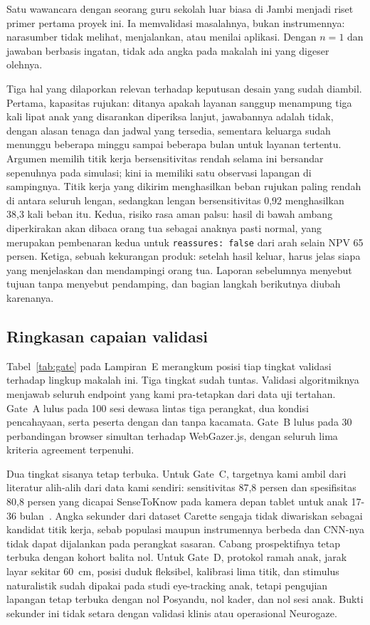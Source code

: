 \documentclass{article}
\begin{document}
Satu wawancara dengan seorang guru sekolah luar biasa di Jambi menjadi riset primer pertama
proyek ini. Ia memvalidasi masalahnya, bukan instrumennya: narasumber tidak melihat,
menjalankan, atau menilai aplikasi. Dengan $n = 1$ dan jawaban berbasis ingatan, tidak ada
angka pada makalah ini yang digeser olehnya.

Tiga hal yang dilaporkan relevan terhadap keputusan desain yang sudah diambil. Pertama,
kapasitas rujukan: ditanya apakah layanan sanggup menampung tiga kali lipat anak yang
disarankan diperiksa lanjut, jawabannya adalah tidak, dengan alasan tenaga dan jadwal yang
tersedia, sementara keluarga sudah menunggu beberapa minggu sampai beberapa bulan untuk
layanan tertentu. Argumen memilih titik kerja bersensitivitas rendah selama ini bersandar
sepenuhnya pada simulasi; kini ia memiliki satu observasi lapangan di sampingnya. Titik kerja
yang dikirim menghasilkan beban rujukan paling rendah di antara seluruh lengan, sedangkan
lengan bersensitivitas 0,92 menghasilkan 38,3 kali beban itu. Kedua, risiko rasa aman palsu:
hasil di bawah ambang diperkirakan akan dibaca orang tua sebagai anaknya pasti normal, yang
merupakan pembenaran kedua untuk \texttt{reassures: false} dari arah selain NPV 65 persen.
Ketiga, sebuah kekurangan produk: setelah hasil keluar, harus jelas siapa yang menjelaskan
dan mendampingi orang tua. Laporan sebelumnya menyebut tujuan tanpa menyebut pendamping, dan
bagian langkah berikutnya diubah karenanya.

\subsection{Ringkasan capaian validasi}

Tabel~\ref{tab:gate} pada Lampiran~E merangkum posisi tiap tingkat validasi terhadap lingkup
makalah ini. Tiga tingkat sudah tuntas. Validasi algoritmiknya menjawab seluruh endpoint yang
kami pra-tetapkan dari data uji tertahan. Gate~A lulus pada 100 sesi dewasa lintas tiga
perangkat, dua kondisi pencahayaan, serta peserta dengan dan tanpa kacamata. Gate~B lulus
pada 30 perbandingan browser simultan terhadap WebGazer.js, dengan seluruh lima kriteria
agreement terpenuhi.

Dua tingkat sisanya tetap terbuka. Untuk Gate~C, targetnya kami ambil dari literatur alih-alih
dari data kami sendiri: sensitivitas 87,8 persen dan spesifisitas 80,8 persen yang dicapai
SenseToKnow pada kamera depan tablet untuk anak 17-36 bulan~\cite{perochon2023}. Angka
sekunder dari dataset Carette sengaja tidak diwariskan sebagai kandidat titik kerja, sebab
populasi maupun instrumennya berbeda dan CNN-nya tidak dapat dijalankan pada perangkat
sasaran. Cabang prospektifnya tetap terbuka dengan kohort balita nol. Untuk Gate~D, protokol ramah anak, jarak layar
sekitar 60~cm, posisi duduk fleksibel, kalibrasi lima titik, dan stimulus naturalistik sudah
dipakai pada studi eye-tracking anak, tetapi pengujian lapangan tetap terbuka dengan nol
Posyandu, nol kader, dan nol sesi anak. Bukti sekunder ini tidak setara dengan validasi
klinis atau operasional Neurogaze.
\end{document}
